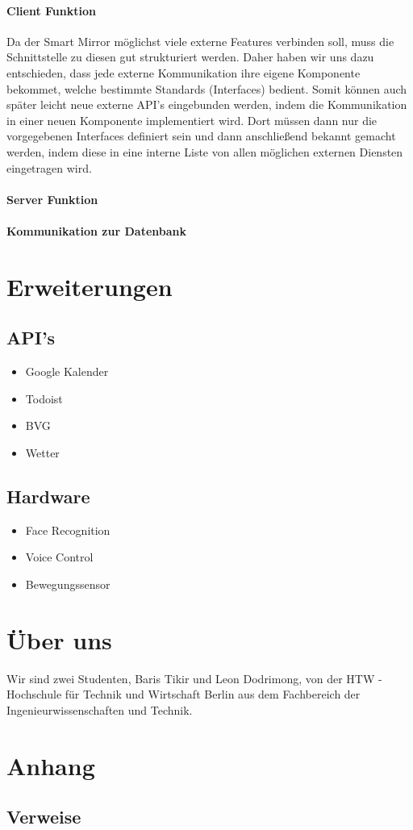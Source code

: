 \documentclass[a4paper,11pt]{article}
\begin{document}
\paragraph{Client Funktion}
Da der Smart Mirror möglichst viele externe Features verbinden soll, muss die Schnittstelle zu diesen gut strukturiert werden. Daher haben wir uns dazu entschieden, dass jede externe Kommunikation ihre eigene Komponente bekommet, welche bestimmte Standards (Interfaces) bedient. Somit können auch später leicht neue externe API's eingebunden werden, indem die Kommunikation in einer neuen Komponente implementiert wird. Dort müssen dann nur die vorgegebenen Interfaces definiert sein und dann anschließend bekannt gemacht werden, indem diese in eine interne Liste von allen möglichen externen Diensten eingetragen wird.
\paragraph{Server Funktion}

\paragraph{Kommunikation zur Datenbank}

\section{Erweiterungen}
\subsection{API's}

\begin{itemize}
\item Google Kalender
\item Todoist
\item BVG
\item Wetter
\end{itemize}
\subsection{Hardware}
\begin{itemize}
\item Face Recognition
\item Voice Control
\item Bewegungssensor
\end{itemize}


\section{Über uns}
Wir sind zwei Studenten, Baris Tikir und Leon Dodrimong, von der HTW - Hochschule für
Technik und Wirtschaft Berlin aus dem Fachbereich der Ingenieurwissenschaften und
Technik. 

\section{Anhang}
\subsection{Verweise}
\end{document}

